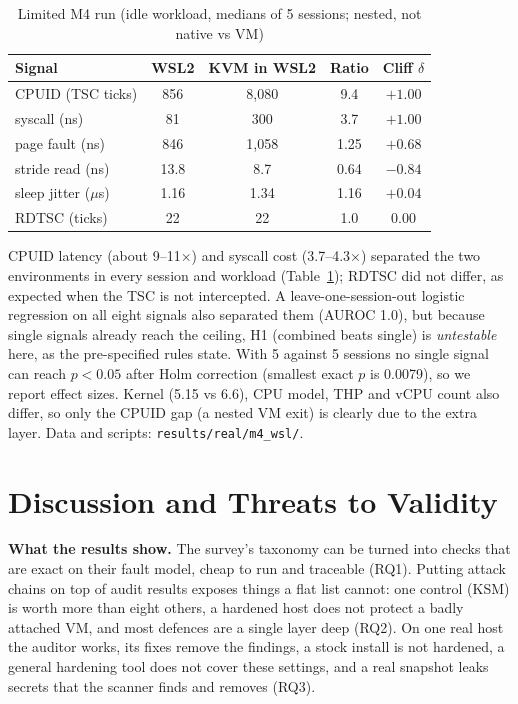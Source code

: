 \documentclass[conference]{IEEEtran}
\begin{document}
\begin{table}[!t]
\caption{Limited M4 run (idle workload, medians of 5 sessions; nested, not native vs VM)}
\label{tab:m4wsl}
\centering\footnotesize
\begin{tabular}{@{}lcccc@{}}
\toprule
Signal & WSL2 & KVM in WSL2 & Ratio & Cliff $\delta$ \\
\midrule
CPUID (TSC ticks) & 856 & 8,080 & 9.4 & $+1.00$ \\
syscall (ns) & 81 & 300 & 3.7 & $+1.00$ \\
page fault (ns) & 846 & 1,058 & 1.25 & $+0.68$ \\
stride read (ns) & 13.8 & 8.7 & 0.64 & $-0.84$ \\
sleep jitter ($\mu$s) & 1.16 & 1.34 & 1.16 & $+0.04$ \\
RDTSC (ticks) & 22 & 22 & 1.0 & $0.00$ \\
\bottomrule
\end{tabular}
\end{table}
CPUID latency (about 9--11$\times$) and syscall cost (3.7--4.3$\times$) separated the two environments in every session and workload (Table~\ref{tab:m4wsl}); RDTSC did not differ, as expected when the TSC is not intercepted. A leave-one-session-out logistic regression on all eight signals also separated them (AUROC 1.0), but because single signals already reach the ceiling, H1 (combined beats single) is \emph{untestable} here, as the pre-specified rules state. With 5 against 5 sessions no single signal can reach $p<0.05$ after Holm correction (smallest exact $p$ is 0.0079), so we report effect sizes. Kernel (5.15 vs 6.6), CPU model, THP and vCPU count also differ, so only the CPUID gap (a nested VM exit) is clearly due to the extra layer. Data and scripts: \texttt{results/real/m4\_wsl/}.

\section{Discussion and Threats to Validity}\label{sec:valid}
\textbf{What the results show.} The survey's taxonomy can be turned into checks that are exact on their fault model, cheap to run and traceable (RQ1). Putting attack chains on top of audit results exposes things a flat list cannot: one control (KSM) is worth more than eight others, a hardened host does not protect a badly attached VM, and most defences are a single layer deep (RQ2). On one real host the auditor works, its fixes remove the findings, a stock install is not hardened, a general hardening tool does not cover these settings, and a real snapshot leaks secrets that the scanner finds and removes (RQ3).
\end{document}
